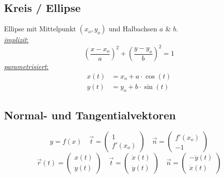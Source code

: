 \subsection{Kreis / Ellipse}
    Ellipse mit Mittelpunkt $(x_o, y_o)$ und Halbachsen $a$ \& $b$.\\
    \underline{\textit{implizit}:}
    $$
        \left(
            \frac{x-x_o}{a}
        \right)^2
        +
        \left(
            \frac{y-y_o}{b}
        \right)^2
        = 1
    $$
    \underline{\textit{parametrisiert}:}
    \begin{align*}
        x(t) &= x_o + a \cdot \cos(t)\\
        y(t) &= y_o + b \cdot \sin(t)
    \end{align*}
\subsection{Normal- und Tangentialvektoren}
    \vspace*{0.75em}
    $$
            y = f(x)
        \quad
            \vec{t} = \begin{pmatrix}
                1\\f'(x_o)
            \end{pmatrix}
        \quad 
            \vec{n} = \begin{pmatrix}
                f'(x_o) \\ -1
            \end{pmatrix}
    $$
    \vspace*{-0.25em}
    \vspace*{0.75em}
    $$
            \vec{r}(t) = \begin{pmatrix}
                x(t)\\y(t)
            \end{pmatrix}
        \quad 
            \vec{t} = \begin{pmatrix}
                \dot{x}(t)\\ \dot{y}(t)
            \end{pmatrix}
        \quad 
            \vec{n} = \begin{pmatrix}
                -\dot{y}(t)\\ \dot{x}(t)
            \end{pmatrix}
    $$